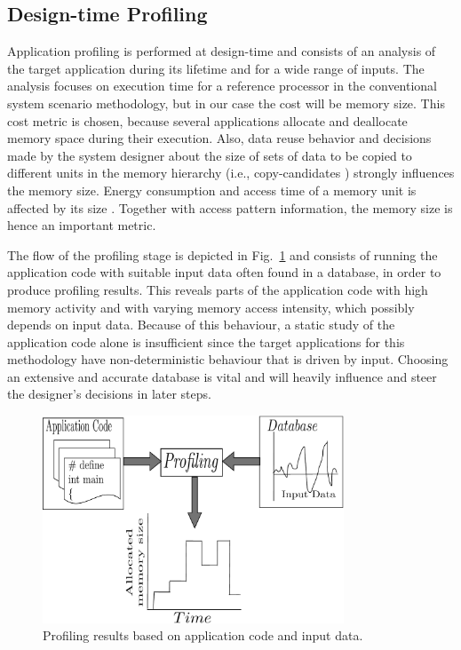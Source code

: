 \subsection{Design-time Profiling}

Application profiling is performed at design-time and consists of an analysis of the target application during its lifetime and for a wide range of inputs. The analysis focuses on execution time for a reference processor in the conventional system scenario methodology, but in our case the cost will be memory size. This cost metric is chosen, because several applications allocate and deallocate memory space during their execution. Also, data reuse behavior and decisions made by the system designer about the size of sets of data to be copied to different units in the memory hierarchy (i.e., copy-candidates \cite{dtse}) strongly influences the memory size. Energy consumption and access time of a memory unit is affected by its size \cite{patterson}. Together with access pattern information, the memory size is hence an important metric.

The flow of the profiling stage is depicted in Fig.~\ref{fig:profilingA} and consists of running the application code with suitable input data often found in a database, in order to produce profiling results. This reveals parts of the application code with high memory activity and with varying memory access intensity, which possibly depends on input data. Because of this behaviour, a static study of the application code alone is insufficient since the target applications for this methodology have non-deterministic behaviour that is driven by input. Choosing an extensive and accurate database is vital and will heavily influence and steer the designer's decisions in later steps.

\begin{figure}[!t]
\centering
\includegraphics[width=0.8\textwidth]{A/profiling_v2-eps-converted-to.pdf}
\caption{Profiling results based on application code and input data.}
\label{fig:profilingA}
\end{figure}

